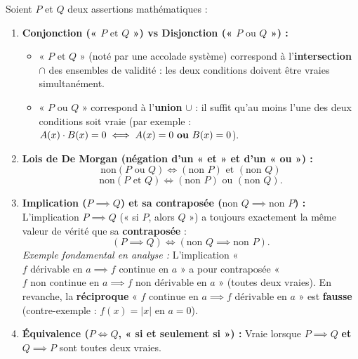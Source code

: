 \begin{theoreme}
Soient $P$ et $Q$ deux assertions mathématiques :
\begin{enumerate}
    \item \textbf{Conjonction (« $P \text{ et } Q$ ») vs Disjonction (« $P \text{ ou } Q$ ») :}
    \begin{itemize}
        \item « $P \text{ et } Q$ » (noté par une accolade système) correspond à l'\textbf{intersection} $\cap$ des ensembles de validité : les deux conditions doivent être vraies simultanément.
        \item « $P \text{ ou } Q$ » correspond à l'\textbf{union} $\cup$ : il suffit qu'au moins l'une des deux conditions soit vraie (par exemple : $A(x)\cdot B(x) = 0 \iff A(x) = 0 \text{ \textbf{ou} } B(x) = 0$).
    \end{itemize}
    \item \textbf{Lois de De Morgan (négation d'un « et » et d'un « ou ») :}
    \[
        \boxed{\text{non}(P \text{ ou } Q) \iff (\text{non } P) \text{ et } (\text{non } Q)}
    \]
    \[
        \boxed{\text{non}(P \text{ et } Q) \iff (\text{non } P) \text{ ou } (\text{non } Q)}.
    \]
    \item \textbf{Implication ($P \implies Q$) et sa contraposée ($\text{non } Q \implies \text{non } P$) :}
    L'implication $P \implies Q$ (« si $P$, alors $Q$ ») a toujours exactement la même valeur de vérité que sa \textbf{contraposée} :
    \[
        \boxed{(P \implies Q) \iff (\text{non } Q \implies \text{non } P)}.
    \]
    \emph{Exemple fondamental en analyse :} L'implication « $f \text{ dérivable en } a \implies f \text{ continue en } a$ » a pour contraposée « $f \text{ non continue en } a \implies f \text{ non dérivable en } a$ » (toutes deux vraies). En revanche, la \textbf{réciproque} « $f \text{ continue en } a \implies f \text{ dérivable en } a$ » est \textbf{fausse} (contre-exemple : $f(x) = |x|$ en $a = 0$).
    \item \textbf{Équivalence ($P \iff Q$, « si et seulement si ») :} Vraie lorsque $P \implies Q$ \textbf{et} $Q \implies P$ sont toutes deux vraies.
\end{enumerate}
\end{theoreme}

